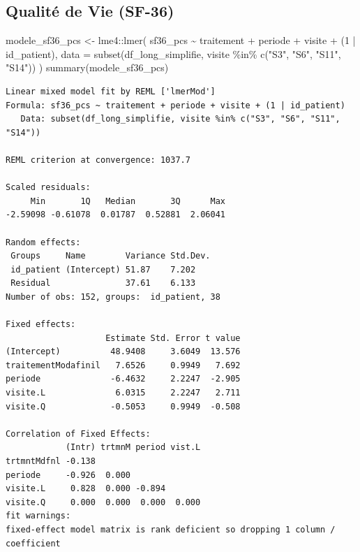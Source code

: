 \documentclass[
  letterpaper,
  DIV=11,
  numbers=noendperiod]{scrartcl}
\newenvironment{Shaded}{\begin{snugshade}}{\end{snugshade}}
\newcommand{\AttributeTok}[1]{\textcolor[rgb]{0.40,0.45,0.13}{#1}}
\newcommand{\DecValTok}[1]{\textcolor[rgb]{0.68,0.00,0.00}{#1}}
\newcommand{\FunctionTok}[1]{\textcolor[rgb]{0.28,0.35,0.67}{#1}}
\newcommand{\NormalTok}[1]{\textcolor[rgb]{0.00,0.23,0.31}{#1}}
\newcommand{\OtherTok}[1]{\textcolor[rgb]{0.00,0.23,0.31}{#1}}
\newcommand{\SpecialCharTok}[1]{\textcolor[rgb]{0.37,0.37,0.37}{#1}}
\newcommand{\StringTok}[1]{\textcolor[rgb]{0.13,0.47,0.30}{#1}}
\begin{document}
\subsection{Qualité de Vie (SF-36)}\label{qualituxe9-de-vie-sf-36}

\begin{Shaded}
\begin{Highlighting}[]
\NormalTok{modele\_sf36\_pcs }\OtherTok{\textless{}{-}}\NormalTok{ lme4}\SpecialCharTok{::}\FunctionTok{lmer}\NormalTok{(}
\NormalTok{  sf36\_pcs }\SpecialCharTok{\textasciitilde{}}\NormalTok{ traitement }\SpecialCharTok{+}\NormalTok{ periode }\SpecialCharTok{+}\NormalTok{ visite }\SpecialCharTok{+}\NormalTok{ (}\DecValTok{1} \SpecialCharTok{|}\NormalTok{ id\_patient),}
  \AttributeTok{data =} \FunctionTok{subset}\NormalTok{(df\_long\_simplifie, visite }\SpecialCharTok{\%in\%} \FunctionTok{c}\NormalTok{(}\StringTok{"S3"}\NormalTok{, }\StringTok{"S6"}\NormalTok{, }\StringTok{"S11"}\NormalTok{, }\StringTok{"S14"}\NormalTok{))}
\NormalTok{)}
\FunctionTok{summary}\NormalTok{(modele\_sf36\_pcs)}
\end{Highlighting}
\end{Shaded}

\begin{verbatim}
Linear mixed model fit by REML ['lmerMod']
Formula: sf36_pcs ~ traitement + periode + visite + (1 | id_patient)
   Data: subset(df_long_simplifie, visite %in% c("S3", "S6", "S11", "S14"))

REML criterion at convergence: 1037.7

Scaled residuals: 
     Min       1Q   Median       3Q      Max 
-2.59098 -0.61078  0.01787  0.52881  2.06041 

Random effects:
 Groups     Name        Variance Std.Dev.
 id_patient (Intercept) 51.87    7.202   
 Residual               37.61    6.133   
Number of obs: 152, groups:  id_patient, 38

Fixed effects:
                    Estimate Std. Error t value
(Intercept)          48.9408     3.6049  13.576
traitementModafinil   7.6526     0.9949   7.692
periode              -6.4632     2.2247  -2.905
visite.L              6.0315     2.2247   2.711
visite.Q             -0.5053     0.9949  -0.508

Correlation of Fixed Effects:
            (Intr) trtmnM period vist.L
trtmntMdfnl -0.138                     
periode     -0.926  0.000              
visite.L     0.828  0.000 -0.894       
visite.Q     0.000  0.000  0.000  0.000
fit warnings:
fixed-effect model matrix is rank deficient so dropping 1 column / coefficient
\end{verbatim}
\end{document}
